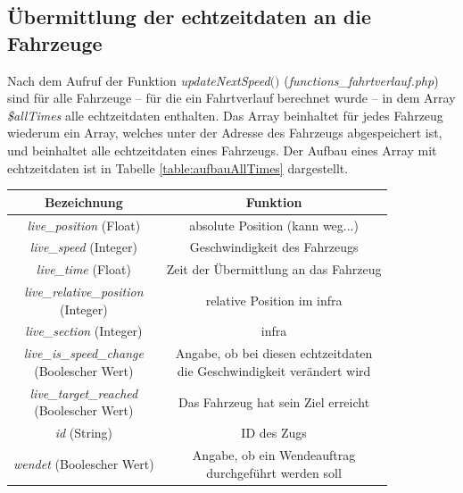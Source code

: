 \subsection{Übermittlung der \Gls{echtzeitdaten} an die Fahrzeuge} \label{main_4}
Nach dem Aufruf der Funktion \textit{updateNextSpeed$($$)$} (\textit{functions\_fahrtverlauf.php}) sind für alle Fahrzeuge -- für die ein Fahrtverlauf berechnet wurde -- in dem Array \textit{\$allTimes} alle \Gls{echtzeitdaten} enthalten. Das Array beinhaltet für jedes Fahrzeug wiederum ein Array, welches unter der Adresse des Fahrzeugs abgespeichert ist, und beinhaltet alle \Gls{echtzeitdaten} eines Fahrzeugs. Der Aufbau eines Array mit \Gls{echtzeitdaten} ist in Tabelle \ref{table:aufbauAllTimes} dargestellt.
\begin{table}
\begin{center}
\renewcommand{\arraystretch}{1.4}
\begin{tabular}{c|c}
Bezeichnung & Funktion \\ \hline
\textit{live\_position} (Float)                  		&    absolute Position (kann weg...)                \\ \hline
\textit{live\_speed} (Integer)                  		&    Geschwindigkeit des Fahrzeugs                \\ \hline
\textit{live\_time} (Float)                  		&    Zeit der Übermittlung an das Fahrzeug                 \\ \hline
\makecell{\textit{live\_relative\_position}\\(Integer)}                  		&    relative Position im \ac{infra}                \\ \hline
\textit{live\_section} (Integer)                  		&    \ac{infra}                \\ \hline
\makecell{\textit{live\_is\_speed\_change}\\(Boolescher Wert)}                  		&    \makecell{Angabe, ob bei diesen \Gls{echtzeitdaten}\\die Geschwindigkeit verändert wird}                \\ \hline
\makecell{\textit{live\_target\_reached}\\(Boolescher Wert)}                  		&    Das Fahrzeug hat sein Ziel erreicht                \\ \hline
\textit{id} (String)                  		&    ID des Zugs                \\ \hline
\textit{wendet} (Boolescher Wert)                  		&    \makecell{Angabe, ob ein Wendeauftrag\\durchgeführt werden soll}                \\ \hline

\end{tabular}
\end{center}
\end{table}
